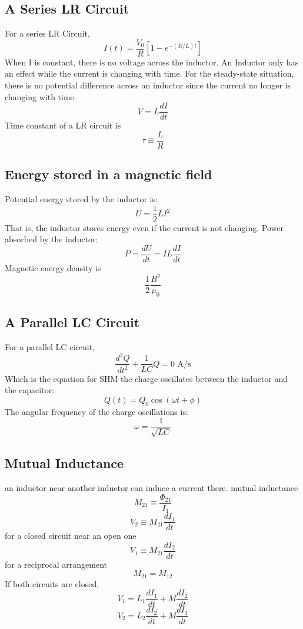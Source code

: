 \documentclass[twocolumn]{article}
\begin{document}
\subsection{A Series LR Circuit}
\begin{outline}
	\1 For a series LR Circuit, \[I(t)=\dfrac{V_0}{R}\left[1-e^{-(R/L)t}\right]\]
		\2 When I is constant, there is no voltage across the inductor. An Inductor only has an effect while the current is changing with time. For the steady-state situation, there is no potential difference across an inductor since the current no longer is changing with time. \[V=L\dfrac{dI}{dt}\]
	\1 Time constant of a LR circuit is \[\tau\equiv\dfrac{L}{R}\]
\end{outline}
\subsection{Energy stored in a magnetic field}
\begin{outline}
	\1 Potential energy stored by the inductor is: \[U=\dfrac{1}{2}LI^2\]
		\2 That is, the inductor stores energy even if the current is not changing. 
	\1 Power absorbed by the inductor: \[P=\dfrac{dU}{dt}=IL\dfrac{dI}{dt}\]
	\1 Magnetic energy density is \[\dfrac{1}{2}\dfrac{B^2}{\mu_0}\]
\end{outline}
\subsection{A Parallel LC Circuit}
\begin{outline}
	\1 For a parallel LC circuit, \[\dfrac{d^2Q}{dt^2}+\dfrac{1}{LC}Q=0\text{ A}/\text{s}\]
		\2 Which is the equation for SHM
	\1 the charge oscillates between the inductor and the capacitor: \[Q(t)=Q_0\cos(\omega t+\phi)\]
	\1 The angular frequency of the charge oscillations is: \[\omega=\dfrac{1}{\sqrt{LC}}\]
\end{outline}
\subsection{Mutual Inductance}
\begin{outline}
	\1 an inductor near another inductor can induce a current there. 
	\1 mutual inductance \[M_{21}\equiv\dfrac{\Phi_{21}}{I_1}\] \[V_2\equiv M_{21}\dfrac{dI_1}{dt}\] for a closed circuit near an open one \[V_1\equiv M_{21}\dfrac{dI_2}{dt}\] for a reciprocal arrangement \[M_{21}=M_{12}\]
	\1 If both circuits are closed, \[V_1=L_1\dfrac{dI_1}{dt}+M\dfrac{dI_2}{dt}\] \[V_2=L_2\dfrac{dI_2}{dt}+M\dfrac{dI_1}{dt}\]
\end{outline}
\end{document}
